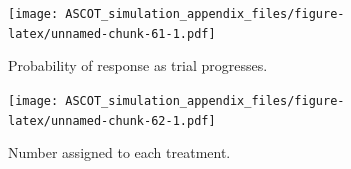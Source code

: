 \documentclass[
]{article}
\begin{document}
\begin{figure}
\centering
\texttt{[image: ASCOT\_simulation\_appendix\_files/figure-latex/unnamed-chunk-61-1.pdf]}
\caption{\label{fig:unnamed-chunk-61}Probability of response as trial progresses.}
\end{figure}

\begin{figure}
\centering
\texttt{[image: ASCOT\_simulation\_appendix\_files/figure-latex/unnamed-chunk-62-1.pdf]}
\caption{\label{fig:unnamed-chunk-62}Number assigned to each treatment.}
\end{figure}

\clearpage
\end{document}
